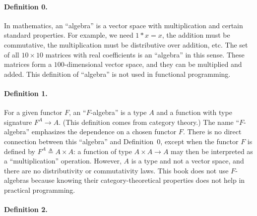 \paragraph{Definition 0.}

In mathematics, an \textquotedblleft algebra\textquotedblright{} is
a vector space with multiplication and certain standard properties.
For example, we need $1*x=x$, the addition must be commutative, the
multiplication must be distributive over addition, etc. The set of
all $10\times10$ matrices with real coefficients is an \textquotedblleft algebra\textquotedblright{}
in this sense. These matrices form a $100$-dimensional vector space,
and they can be multiplied and added. This definition of \textsf{``}algebra\textsf{''}
is not used in functional programming.

\paragraph{Definition 1.}

For a given functor $F$, an \textsf{``}$F$-algebra\textsf{''}
is a type $A$ and a function with type signature $F^{A}\rightarrow A$.
(This definition comes from category theory.) The name \textsf{``}$F$-algebra\textsf{''}
emphasizes the dependence on a chosen functor $F$. There is no direct
connection between this \textsf{``}algebra\textsf{''} and Definition~0, except when
the functor $F$ is defined by $F^{A}\triangleq A\times A$: a function
of type $A\times A\rightarrow A$ may then be interpreted as a \textsf{``}multiplication\textsf{''}
operation. However, $A$ is a type and not a vector space, and there
are no distributivity or commutativity laws. This book does not use
$F$-algebras because knowing their category-theoretical properties
does not help in practical programming.

\paragraph{Definition 2.}

